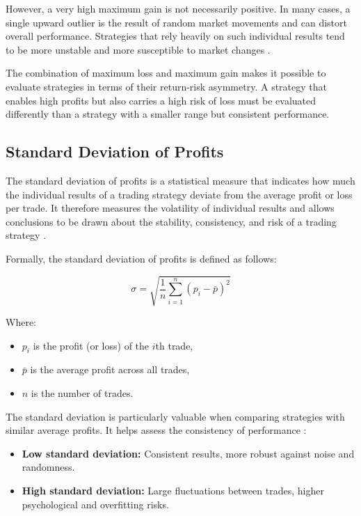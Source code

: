 However, a very high maximum gain is not necessarily positive.
In many cases, a single upward outlier is the result of random market movements and can distort overall performance.
Strategies that rely heavily on such individual results tend to be more unstable and more susceptible to market changes \cite{max-gain}.

The combination of maximum loss and maximum gain makes it possible to evaluate strategies in terms of their return-risk asymmetry.
A strategy that enables high profits but also carries a high risk of loss must be evaluated differently than a strategy with a smaller range but consistent performance.

\subsection{Standard Deviation of Profits}

The standard deviation of profits is a statistical measure that indicates how much the individual results of a trading strategy deviate from the average profit or loss per trade.
It therefore measures the volatility of individual results and allows conclusions to be drawn about the stability, consistency, and risk of a trading strategy \cite{std}.

Formally, the standard deviation of profits is defined as follows:

\[
    \sigma = \sqrt{\frac{1}{n} \sum_{i=1}^n (p_i - \bar{p})^2}
\]

\noindent
Where:

\begin{itemize}
    \item \(p_i\) is the profit (or loss) of the \(i\)th trade,
    \item \(\bar{p}\) is the average profit across all trades,
    \item \(n\) is the number of trades.
\end{itemize}

\noindent
The standard deviation is particularly valuable when comparing strategies with similar average profits.
It helps assess the consistency of performance \cite{std}:

\begin{itemize}
    \item \textbf{Low standard deviation:} Consistent results, more robust against noise and randomness.
    \item \textbf{High standard deviation:} Large fluctuations between trades, higher psychological and overfitting risks.
\end{itemize}

